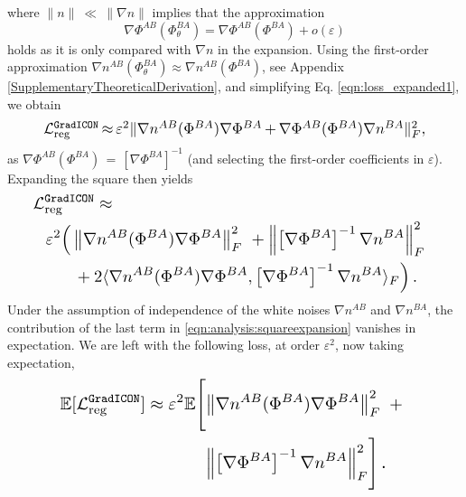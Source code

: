 where $\| n\|~{\ll}~\| \nabla n \|$ implies that the approximation
\begin{equation}
	\nabla \Phi^{AB}(\Phi^{BA}_\theta) = \nabla \Phi^{AB}(\Phi^{BA}) + o(\varepsilon)
\end{equation}
holds as it is only compared with $\nabla n$ in the expansion. Using the first-order approximation $\nabla n^{AB}(\Phi_\theta^{BA}){\approx}\nabla n^{AB}(\Phi^{BA})$, see Appendix \ref{SupplementaryTheoreticalDerivation},
and simplifying Eq. \eqref{eqn:loss_expanded1}, we obtain
\begin{equation}\label{EqExpansion2}
	\resizebox{0.9\columnwidth}{!}{
		$\lreggicon\,{\approx}\,\varepsilon^2 \| \nabla n^{AB}( \Phi^{BA}) \nabla \Phi^{BA}\,{+}\,
			\nabla \Phi^{AB}(\Phi^{BA})  \nabla n^{BA}\|_F^2,$
	}
\end{equation}
as $\nabla \Phi^{AB}(\Phi^{BA})\,{=}\,[\nabla \Phi^{BA}]^{-1}$ (and selecting the first-order coefficients in $\varepsilon$).
Expanding the square then yields
\begin{equation}
    \label{eqn:analysis:squareexpansion}
    \resizebox{.9\columnwidth}{!}{%
    $
    \begin{split}
        & \hspace{-0.8cm}\lreggicon \approx \\
        \hspace{0.15cm}\varepsilon^2
        \Bigl(
        & \left\| \nabla n^{AB}(\Phi^{BA}) \nabla \Phi^{BA}\right\|^2_{F}~+ %
        \left\| \left[\nabla \Phi^{BA}\right]^{-1}\nabla n^{BA} \right\|^2_{F} \\
        & \, + 2 \langle  \nabla n^{AB}(\Phi^{BA}) \nabla \Phi^{BA},\left[\nabla \Phi^{BA}\right]^{-1}\nabla n^{BA} \rangle_{F}
        \Bigr)\,.
    \end{split}
    $
 }
\end{equation}
Under the assumption of independence of the white noises $\nabla n^{AB}$ and $\nabla n^{BA}$, the contribution of the last term in \ref{eqn:analysis:squareexpansion} vanishes in expectation. We are left with the following loss, at order $\varepsilon^2$, now taking expectation,
\vspace{-0.1cm}
\begin{equation}
    \label{EqTakingExpectation}
    \resizebox{.8\columnwidth}{!}{%
    $
    \begin{split}
        \mathbb{E}[\lreggicon] \approx \varepsilon^2 &
        \mathbb{E}
        \Biggl[
        \left\| \nabla n^{AB}(\Phi^{BA}) \nabla \Phi^{BA}\right\|^2_{F}
        ~+ \\
        & \hspace{0.38cm}
        \left\|
        \left[\nabla \Phi^{BA}\right]^{-1}\nabla n^{BA}
        \right\|^2_{F}
        \Biggr] \,.
    \end{split}
     $
 }
\end{equation}
